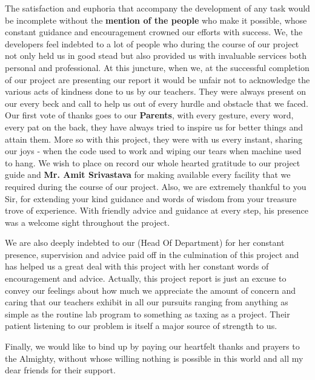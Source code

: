 	The satisfaction and euphoria that accompany the development of any task would be incomplete
	without the \textbf{mention of the people} who make it possible, whose constant guidance and
	encouragement crowned our efforts with success.
	\vs
	We, the developers feel indebted to a lot of people who during the course of our project not only held
	us in good stead but also provided us with invaluable services both personal and professional.
	\vs
	At this juncture, when we, at the successful completion of our project are presenting our report it
	would be unfair not to acknowledge the various acts of kindness done to us by our teachers. They
	were always present on our every beck and call to help us out of every hurdle and obstacle that we
	faced.
	\vs
	Our first vote of thanks goes to our \textbf{Parents}, with every gesture, every word, every pat on the back,
	they have always tried to inspire us for better things and attain them. More so with this project, they
	were with us every instant, sharing our joys - when the code used to work and wiping our tears when
	machine used to hang.
	\vs
	We wish to place on record our whole hearted gratitude to \textbf{\sir} our project guide
	and \textbf{Mr. Amit Srivastava} for making available every facility that we required during the course of
	our project. Also, we are extremely thankful to you Sir, for extending your kind guidance and words
	of wisdom from your treasure trove of experience. With friendly advice and guidance at every step,
	his presence was a welcome sight throughout the project.
	
	\vs
	We are also deeply indebted to our (Head Of Department) \textbf{\hod} for her constant presence, supervision
 	and advice paid off in the culmination of this project and has helped us a great deal with this project
	with her constant words of encouragement and advice.
	\vs
	Actually, this project report is just an excuse to convey our feelings about how much we appreciate
	the amount of concern and caring that our teachers exhibit in all our pursuits ranging from anything
	as simple as the routine lab program to something as taxing as a project. Their patient listening to
	our problem is itself a major source of strength to us.
	\vs
	
	Finally, we would like to bind up by paying our heartfelt thanks and prayers to the Almighty,
	without whose willing nothing is possible in this world and all my dear friends for their
	support. 
	\pagebreak 
	
	\tableofcontents
	
	\pagebreak